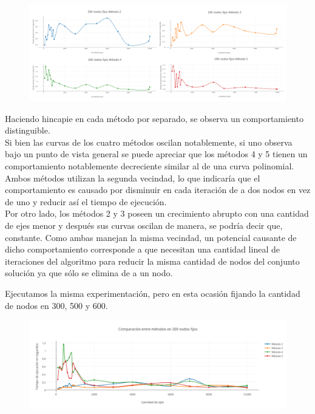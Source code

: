    \begin{figure}[h!]
   \begin{center}
 	\includegraphics[scale=0.08]{imagenes/local/tiempos/200nodos2.png}
   \end{center}
 \end{figure}
 
 Haciendo hincapie en cada m\'etodo por separado, se observa un comportamiento distinguible.\\
 
 Si bien las curvas de los cuatro m\'etodos oscilan notablemente, si uno observa bajo un punto de vista general se puede apreciar que los m\'etodos 4 y 5 tienen un comportamiento notablemente decreciente similar al de una curva polinomial. Ambos m\'etodos utilizan la segunda vecindad, lo que indicar\'ia que el comportamiento es causado por disminuir en cada iteración de a dos nodos en vez de uno y reducir así el tiempo de ejecución.\\
 
 Por otro lado, los m\'etodos 2 y 3 poseen un crecimiento abrupto con una cantidad de ejes menor y despu\'es sus curvas oscilan de manera, se podr\'ia decir que, constante. Como ambas manejan la misma vecindad, un potencial causante de dicho comportamiento corresponde a que necesitan una cantidad lineal de iteraciones del algoritmo para reducir la misma cantidad de nodos del conjunto solución ya que sólo se elimina de a un nodo.\\

\bigskip

Ejecutamos la misma experimentaci\'on, pero en esta ocasi\'on fijando la cantidad de nodos en 300, 500 y 600. 
 
  \begin{figure}[h!]
   \begin{center}
 	\includegraphics[scale=0.55]{imagenes/local/tiempos/300nodos.png}
   \end{center}
 \end{figure}
 
